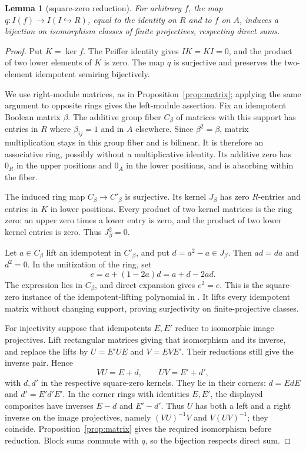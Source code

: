 \documentclass[11pt]{amsart}
\newtheorem{lemma}[theorem]{Lemma}
\theoremstyle{definition}
\theoremstyle{remark}
\begin{document}
\begin{lemma}[square-zero reduction]\label{lem:twolevelnil}
For arbitrary $f$, the map $q:I(f)\to I(I\hookrightarrow R)$, equal to the identity on $R$ and to $f$ on $A$, induces a bijection on isomorphism classes of finite projectives, respecting direct sums.
\end{lemma}
\begin{proof}
Put $K=\ker f$. The Peiffer identity gives $IK=KI=0$, and the product of two lower elements of $K$ is zero. The map $q$ is surjective and preserves the two-element idempotent semiring bijectively.

We use right-module matrices, as in Proposition~\ref{prop:matrix}; applying the same argument to opposite rings gives the left-module assertion. Fix an idempotent Boolean matrix $\beta$. The additive group fiber $C_\beta$ of matrices with this support has entries in $R$ where $\beta_{ij}=1$ and in $A$ elsewhere. Since $\beta^2=\beta$, matrix multiplication stays in this group fiber and is bilinear. It is therefore an associative ring, possibly without a multiplicative identity. Its additive zero has $0_R$ in the upper positions and $0_A$ in the lower positions, and is absorbing within the fiber.

The induced ring map $C_\beta\to C'_\beta$ is surjective. Its kernel $J_\beta$ has zero $R$-entries and entries in $K$ in lower positions. Every product of two kernel matrices is the ring zero: an upper zero times a lower entry is zero, and the product of two lower kernel entries is zero. Thus $J_\beta^2=0$.

Let $a\in C_\beta$ lift an idempotent in $C'_\beta$, and put $d=a^2-a\in J_\beta$. Then $ad=da$ and $d^2=0$. In the unitization of the ring, set
\[
 e=a+(1-2a)d=a+d-2ad.
\]
The expression lies in $C_\beta$, and direct expansion gives $e^2=e$. This is the square-zero instance of the idempotent-lifting polynomial in \cite[Lemma~10.32.7, Tag~05BU]{Stacks}. It lifts every idempotent matrix without changing support, proving surjectivity on finite-projective classes.

For injectivity suppose that idempotents $E,E'$ reduce to isomorphic image projectives. Lift rectangular matrices giving that isomorphism and its inverse, and replace the lifts by $U=E'UE$ and $V=EVE'$. Their reductions still give the inverse pair. Hence
\[
 VU=E+d,\qquad UV=E'+d',
\]
with $d,d'$ in the respective square-zero kernels. They lie in their corners: $d=EdE$ and $d'=E'd'E'$. In the corner rings with identities $E,E'$, the displayed composites have inverses $E-d$ and $E'-d'$. Thus $U$ has both a left and a right inverse on the image projectives, namely $(VU)^{-1}V$ and $V(UV)^{-1}$; they coincide. Proposition~\ref{prop:matrix} gives the required isomorphism before reduction. Block sums commute with $q$, so the bijection respects direct sum.
\end{proof}
\end{document}

